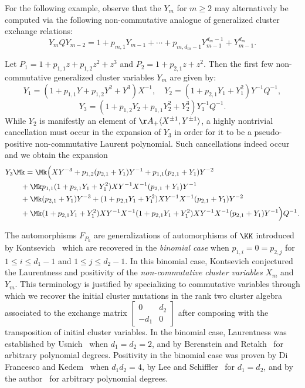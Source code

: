  For the following example, observe that the $Y_m$ for $m\ge2$ may alternatively be computed via the following non-commutative analogue of generalized cluster exchange relations:
 \begin{equation}
 \label{eq:non-commutative exchange relation}
 Y_mQY_{m-2}=1+p_{m,1}Y_{m-1}+\cdots+p_{m,d_m-1}Y_{m-1}^{d_m-1}+Y_{m-1}^{d_m}.
 \end{equation}
 \begin{introexample}
 Let $P_1=1+p_{1,1}z+p_{1,2}z^2+z^3$ and $P_2=1+p_{2,1}z+z^2$.
 Then the first few non-commutative generalized cluster variables $Y_m$ are given by:
 \[ Y_1=(1+p_{1,1}Y+p_{1,2}Y^2+Y^3)X^{-1}, \quad Y_2=(1+p_{2,1}Y_1+Y_1^2)Y^{-1}Q^{-1},\]
 \[Y_3=(1+p_{1,2}Y_2+p_{1,1}Y_2^2+Y_2^3)Y_1^{-1}Q^{-1}.\]
 While $Y_2$ is manifestly an element of $\AA_+\langle X^{\pm1},Y^{\pm1}\rangle$, a highly nontrivial cancellation must occur in the expansion of $Y_3$ in order for it to be a pseudo-positive non-commutative Laurent polynomial.
 Such cancellations indeed occur and we obtain the expansion
 \begin{align*}
 Y_3&\Mk =\Mk 
 \Big(XY^{-3}+p_{1,2}(p_{2,1}+Y_1)Y^{-1}+p_{1,1}(p_{2,1}+Y_1)Y^{-2}\\
 &\quad +\Mk p_{1,1}(1+p_{2,1}Y_1+Y_1^2)XY^{-1}X^{-1}(p_{2,1}+Y_1)Y^{-1}\\
 &\quad +\Mk (p_{2,1}+Y_1)Y^{-3}+(1+p_{2,1}Y_1+Y_1^2)XY^{-1}X^{-1}(p_{2,1}+Y_1)Y^{-2}\\
 &\quad +\Mk (1+p_{2,1}Y_1+Y_1^2)XY^{-1}X^{-1}(1+p_{2,1}Y_1+Y_1^2)XY^{-1}X^{-1}(p_{2,1}+Y_1)Y^{-1}\Big)Q^{-1}.
 \end{align*}
 \end{introexample}

 The automorphisms $F_{P_k}$ are generalizations of automorphisms of $\KK$ introduced by Kontsevich~\cite{kontsevich} which are recovered in the \emph{binomial case} when $p_{1,i}=0=p_{2,j}$ for $1\le i\le d_1-1$ and $1\le j\le d_2-1$.
 In this binomial case, Kontsevich conjectured the Laurentness and positivity of the \emph{non-commutative cluster variables} $X_m$ and $Y_m$.
 This terminology is justified by specializing to commutative variables through which we recover the initial cluster mutations in the rank two cluster algebra~\cite{fomin-zelevinsky} associated to the exchange matrix $\left[\begin{array}{cc} 0 & d_2\\ -d_1 & 0\end{array}\right]$ after composing with the transposition of initial cluster variables.
 In the binomial case, Laurentness was established by Usnich~\cite{usnich0} when $d_1=d_2=2$, and by Berenstein and Retakh~\cite{berenstein-retakh} for arbitrary polynomial degrees.
 Positivity in the binomial case was proven by Di Francesco and Kedem~\cite{difrancesco-kedem} when $d_1d_2=4$, by Lee and Schiffler~\cite{lee-schiffler} for $d_1=d_2$, and by the author~\cite{rupel1} for arbitrary polynomial degrees.

